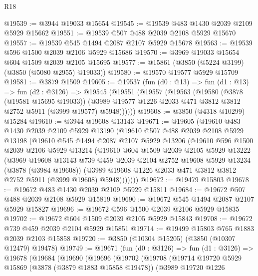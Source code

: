 \begin{lexlean}{R18}
\begin{coremodule}
@19539 := @3944 @19033 @15654
@19545 := @19539 @483 @1430 @2039 @2109 @5929 @15662
@19551 := @19539 @507 @488 @2039 @2108 @5929 @15670
@19557 := @19539 @545 @1494 @2087 @2107 @5929 @15678
@19563 := @19539 @596 @1500 @2039 @2106 @5929 @15686
@19570 := @3969 @19033 @15654 @604 @1509 @2039 @2105 @15695
@19577 := @15861 (@3850 (@5224 @3199) (@3850 (@5080 @2955) @19033))
@19580 := @19570 @19577 @5929 @15709
@19581 := @3879 @1509
@19605 := @19537
    (fun (d0 : @13) =>
    fun (d1 : @13) =>
    fun (d2 : @3126) =>
    @19545
      (@19551
        (@19557
          (@19563
            (@19580
              (@3878 (@19581 @15695 @19033))
              (@3989 @19577 @1226 @2033 @471 @3812 @3812 @2752 @5911 (@3999 @19577) @5948))))))
@19608 := @3850 (@4318 @10299) @15284
@19610 := @3944 @19608 @13143
@19671 := @19605
    (@19610
      @483
      @1430
      @2039
      @2109
      @5929
      @13190
      (@19610
        @507
        @488
        @2039
        @2108
        @5929
        @13198
        (@19610
          @545
          @1494
          @2087
          @2107
          @5929
          @13206
          (@19610
            @596
            @1500
            @2039
            @2106
            @5929
            @13214
            (@19610
              @604
              @1509
              @2039
              @2105
              @5929
              @13222
              (@3969
                @19608
                @13143
                @739
                @459
                @2039
                @2104
                @2752
                @19608
                @5929
                @13234
                (@3878 (@3984 @19608))
                (@3989 @19608 @1226 @2033 @471 @3812 @3812 @2752 @5911 (@3999 @19608) @5948)))))))
@19672 := @19479 @15803
@19678 := @19672 @483 @1430 @2039 @2109 @5929 @15811
@19684 := @19672 @507 @488 @2039 @2108 @5929 @15819
@19690 := @19672 @545 @1494 @2087 @2107 @5929 @15827
@19696 := @19672 @596 @1500 @2039 @2106 @5929 @15835
@19702 := @19672 @604 @1509 @2039 @2105 @5929 @15843
@19708 := @19672 @739 @459 @2039 @2104 @5929 @15851
@19714 := @19499 @15803 @765 @1883 @2039 @2103 @15858
@19720 := @3850 (@10304 @15205) (@3850 (@10307 @12479) @19478)
@19749 := @19671
    (fun (d0 : @3126) =>
    fun (d1 : @3126) =>
    @19678
      (@19684
        (@19690
          (@19696
            (@19702
              (@19708
                (@19714
                  @19720
                  @5929
                  @15869
                  (@3878 (@3879 @1883 @15858 @19478))
                  (@3989
                    @19720
                    @1226

\end{coremodule}
\end{lexlean}

